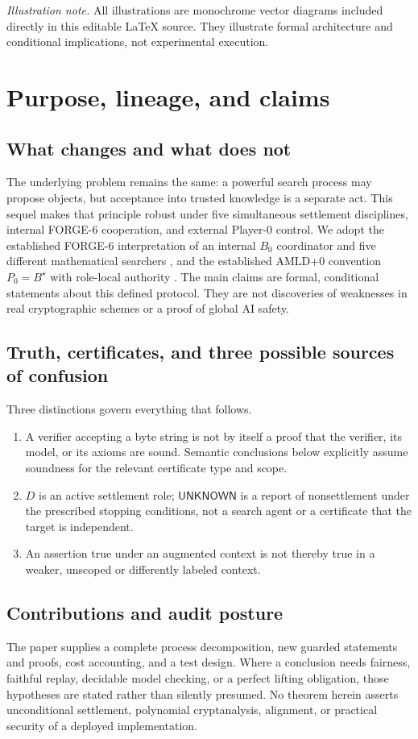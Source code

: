 \documentclass[11pt,letterpaper,oneside]{book}
\theoremstyle{definition}
\theoremstyle{remark}
\begin{document}
\noindent\small\textit{Illustration note.} All illustrations are monochrome vector diagrams included directly in this editable LaTeX source. They illustrate formal architecture and conditional implications, not experimental execution.\normalsize
\tableofcontents
\mainmatter

\chapter{Purpose, lineage, and claims}
\section{What changes and what does not}
The underlying problem remains the same: a powerful search process may propose
objects, but acceptance into trusted knowledge is a separate act. This sequel
makes that principle robust under five simultaneous settlement disciplines,
internal FORGE-6 cooperation, and external Player-0 control. We adopt the
established FORGE-6 interpretation of an internal $B_0$ coordinator and five
different mathematical searchers \cite{forge}, and the established
AMLD+0 convention $P_0=B^\star$ with role-local authority \cite{depths}.
The main claims are formal, conditional statements about this defined protocol.
They are not discoveries of weaknesses in real cryptographic schemes or a proof
of global AI safety.

\section{Truth, certificates, and three possible sources of confusion}
Three distinctions govern everything that follows.
\begin{enumerate}
\item A verifier accepting a byte string is not by itself a proof that the verifier,
its model, or its axioms are sound. Semantic conclusions below explicitly assume
soundness for the relevant certificate type and scope.
\item $D$ is an active settlement role; $\mathsf{UNKNOWN}$ is a report of
nonsettlement under the prescribed stopping conditions, not a search agent or
a certificate that the target is independent.
\item An assertion true under an augmented context is not thereby true in a
weaker, unscoped or differently labeled context.
\end{enumerate}

\section{Contributions and audit posture}
The paper supplies a complete process decomposition, new guarded statements and
proofs, cost accounting, and a test design. Where a conclusion needs fairness,
faithful replay, decidable model checking, or a perfect lifting obligation,
those hypotheses are stated rather than silently presumed. No theorem herein
asserts unconditional settlement, polynomial cryptanalysis, alignment, or
practical security of a deployed implementation.
\end{document}
